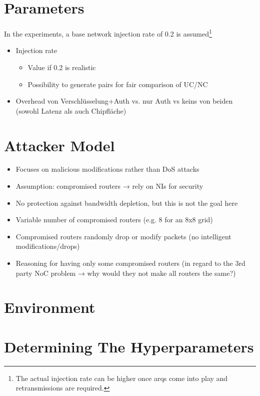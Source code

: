 \section{Parameters}
In the experiments, a base network injection rate of 0.2 is assumed\footnote{The actual injection rate can be higher once \glspl{arq} come into play
and retransmissions are required.}
\begin{itemize}
    \item Injection rate
        \begin{itemize}
            \item Value if 0.2 is realistic
            \item Possibility to generate pairs for fair comparison of UC/NC
        \end{itemize}
    \item Overhead von Verschlüsselung+Auth vs. nur Auth vs keins von beiden (sowohl Latenz als auch Chipfläche)
\end{itemize}

\section{Attacker Model}
\begin{itemize}
    \item Focuses on malicious modifications rather than DoS attacks
    \item Assumption: compromised routers → rely on NIs for security
    \item No protection against bandwidth depletion, but this is not the goal here
    \item Variable number of compromised routers (e.g. 8 for an 8x8 grid)
    \item Compromised routers randomly drop or modify packets (no intelligent modifications/drops)
    \item Reasoning for having only some compromised routers (in regard to the 3rd party NoC problem → why would they not make all routers the same?)
\end{itemize}

\section{Environment}

\section{Determining The Hyperparameters}
